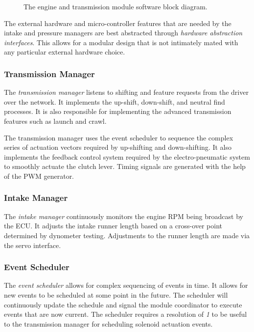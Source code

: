 \begin{figure}[H]
	\centering
	
	\caption{The engine and transmission module software block diagram.}
	\label{fig:engine_software_design_block}
\end{figure}

The external hardware and micro-controller features that are needed by the intake and pressure managers are best abstracted through \emph{hardware abstraction interfaces}. This allows for a modular design that is not intimately mated with any particular external hardware choice. 

\subsubsection{Transmission Manager}

The \emph{transmission manager} listens to shifting and feature requests from the driver over the network. It implements the up-shift, down-shift, and neutral find processes. It is also responsible for implementing the advanced transmission features such as launch and crawl.

The transmission manager uses the event scheduler to sequence the complex series of actuation vectors required by up-shifting and down-shifting. It also implements the feedback control system required by the electro-pneumatic system to smoothly actuate the clutch lever. Timing signals are generated with the help of the PWM generator.

\subsubsection{Intake Manager}

The \emph{intake manager} continuously monitors the engine RPM being broadcast by the ECU. It adjusts the intake runner length based on a cross-over point determined by dynometer testing. Adjustments to the runner length are made via the servo interface.

\subsubsection{Event Scheduler}

The \emph{event scheduler} allows for complex sequencing of events in time. It allows for new events to be scheduled at some point in the future.
The scheduler will continuously update the schedule and signal the module coordinator to execute events that are now current. The scheduler requires a resolution of \emph{1}{\milli\second} to be useful to the transmission manager for scheduling solenoid actuation events.

